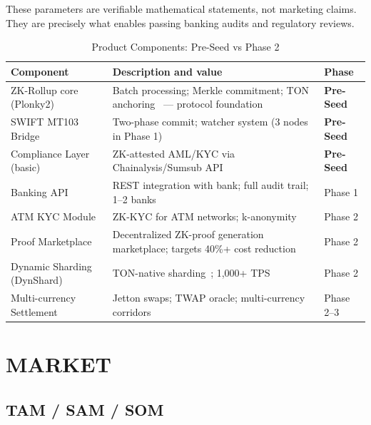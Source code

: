 \documentclass[11pt,a4paper]{article}
\begin{document}
These parameters are verifiable mathematical statements, not marketing claims. They are precisely what enables passing banking audits and regulatory reviews.

\begin{table}[htbp]
\centering
\caption{Product Components: Pre-Seed vs Phase 2}
\begin{tabularx}{\linewidth}{@{}lXl@{}}
\toprule
\textbf{Component} & \textbf{Description and value} & \textbf{Phase} \\
\midrule
ZK-Rollup core (Plonky2)~\cite{plonky2}    & Batch processing; Merkle commitment; TON anchoring~\cite{ton_docs} --- protocol foundation         & \textbf{Pre-Seed} \\
SWIFT MT103 Bridge~\cite{swift_mt103}          & Two-phase commit; watcher system (3 nodes in Phase 1)                             & \textbf{Pre-Seed} \\
Compliance Layer (basic)    & ZK-attested AML/KYC via Chainalysis/Sumsub API~\cite{fatf_aml_tech}                                      & \textbf{Pre-Seed} \\
Banking API                 & REST integration with bank; full audit trail; 1--2 banks                          & Phase 1 \\
ATM KYC Module              & ZK-KYC for ATM networks; k-anonymity                                              & Phase 2 \\
Proof Marketplace           & Decentralized ZK-proof generation marketplace; targets 40\%+ cost reduction              & Phase 2 \\
Dynamic Sharding (DynShard) & TON-native sharding~\cite{ton_docs}; 1,000+ TPS                                           & Phase 2 \\
Multi-currency Settlement   & Jetton swaps; TWAP oracle; multi-currency corridors                               & Phase 2--3 \\
\bottomrule
\end{tabularx}
\end{table}


\FloatBarrier
\section{MARKET}

\subsection*{TAM / SAM / SOM}
\end{document}
